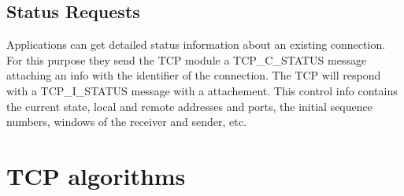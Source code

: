 \subsection{Status Requests}

Applications can get detailed status information about an existing
connection. For this purpose they send the TCP module a TCP\_C\_STATUS
message attaching an  info with the identifier
of the connection. The TCP will respond with a TCP\_I\_STATUS message
with a  attachement. This control info
contains the current state, local and remote addresses and ports,
the initial sequence numbers, windows of the receiver and sender, etc.

% 
% 
% 
% 
% 

\section{TCP algorithms}
\label{sec:tcp_algorithms}

